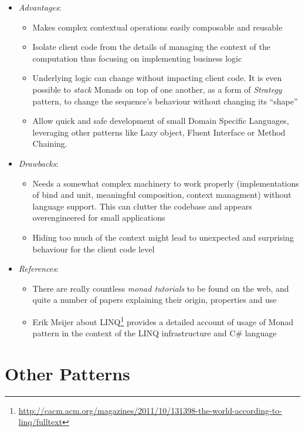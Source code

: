 \documentclass[11pt,]{article}
\renewcommand{\href}[2]{#2\footnote{\url{#1}}}
\begin{document}
\begin{itemize}
\item
  \emph{Advantages}:

  \begin{itemize}
  \item
    Makes complex contextual operations easily composable and reusable
  \item
    Isolate client code from the details of managing the context of the
    computation thus focusing on implementing business logic
  \item
    Underlying logic can change without impacting client code. It is
    even possible to \emph{stack} Monads on top of one another, as a
    form of \emph{Strategy} pattern, to change the sequence's behaviour
    without changing its ``shape''
  \item
    Allow quick and safe development of small Domain Specific Languages,
    leveraging other patterns like Lazy object, Fluent Interface or
    Method Chaining.
  \end{itemize}
\item
  \emph{Drawbacks}:

  \begin{itemize}
  \item
    Needs a somewhat complex machinery to work properly (implementations
    of bind and unit, meaningful composition, context managment) without
    language support. This can clutter the codebase and appears
    overengineered for small applications
  \item
    Hiding too much of the context might lead to unexpected and
    surprising behaviour for the client code level
  \end{itemize}
\item
  \emph{References}:

  \begin{itemize}
  \item
    There are really countless \emph{monad tutorials} to be found on the
    web, and quite a number of papers explaining their origin,
    properties and use
  \item
    \href{http://cacm.acm.org/magazines/2011/10/131398-the-world-according-to-linq/fulltext}{Erik
    Meijer about LINQ} provides a detailed account of usage of Monad
    pattern in the context of the LINQ infrastructure and C\# language
  \end{itemize}
\end{itemize}

\section{Other Patterns}
\end{document}
